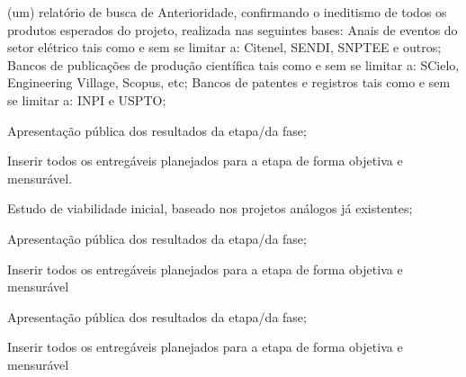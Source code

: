 \xxx \textbf{}

 (um) relatório de busca de Anterioridade, confirmando o ineditismo de todos os produtos esperados do projeto, realizada nas seguintes bases: Anais de eventos do setor elétrico tais como e sem se limitar a: Citenel, SENDI, SNPTEE e outros; Bancos de publicações de produção científica tais como e sem se limitar a: SCielo, Engineering Village, Scopus, etc; Bancos de patentes e registros tais como e sem se limitar a: INPI e USPTO;

\xxxx Apresentação pública dos resultados da etapa/da fase;

\xxxx Inserir todos os entregáveis planejados para a etapa de forma objetiva e mensurável.

\xxxx Estudo de viabilidade inicial, baseado nos projetos análogos já existentes;

\xxx \textbf{}

\xxxx Apresentação pública dos resultados da etapa/da fase;

\xxxx Inserir todos os entregáveis planejados para a etapa de forma objetiva e mensurável

\xxx \textbf{}

\xxxx Apresentação pública dos resultados da etapa/da fase;

\xxxx Inserir todos os entregáveis planejados para a etapa de forma objetiva e mensurável

\xxx \textbf{}

